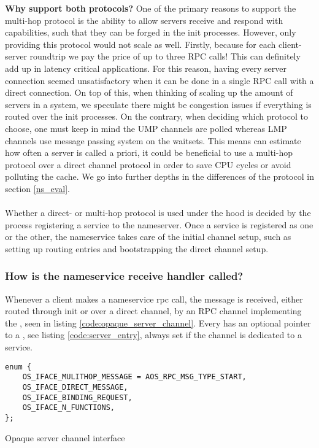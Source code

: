 \textbf{Why support both protocols?} One of the primary reasons to support the multi-hop protocol is the ability to allow servers receive and respond with capabilities, such that they can be forged in the init processes. However, only providing this protocol would not scale as well. Firstly, because for each client-server roundtrip we pay the price of up to three RPC calls! This can definitely add up in latency critical applications. For this reason, having every server connection seemed unsatisfactory when it can be done in a single RPC call with a direct connection. On top of this, when thinking of scaling up the amount of servers in a system, we speculate there might be congestion issues if everything is routed over the init processes. 
On the contrary, when deciding which protocol to choose, one must keep in mind the UMP channels are polled whereas LMP channels use message passing system on the waitsets. This means can estimate how often a server is called a priori, it could be beneficial to use a multi-hop protocol over a direct channel protocol in order to save CPU cycles or avoid polluting the cache. We go into further depths in the differences of the protocol in section \ref{ns_eval}.


\paragraph{}
Whether a direct- or multi-hop protocol is used under the hood is decided by the process registering a service to the nameserver. Once a service is registered as one or the other, the nameservice takes care of the initial channel setup, such as setting up routing entries and bootstrapping the direct channel setup.


\subsubsection{How is the nameservice receive handler called?}

Whenever a client makes a nameservice rpc call, the message is received, either routed through init or over a direct channel, by an RPC channel implementing the , seen in listing \ref{code:opaque_server_channel}. Every  has an optional pointer to a , see listing \ref{code:server_entry}, always set if the channel is dedicated to a service. 
\begin{code}
\begin{mdframed}[style=myframe]
\begin{verbatim}
enum {
    OS_IFACE_MULITHOP_MESSAGE = AOS_RPC_MSG_TYPE_START,
    OS_IFACE_DIRECT_MESSAGE,
    OS_IFACE_BINDING_REQUEST,
    OS_IFACE_N_FUNCTIONS,
};
\end{verbatim}
\end{mdframed}
\caption{Opaque server channel interface}
\newline
\label{code:opaque_server_channel}
\end{code}
